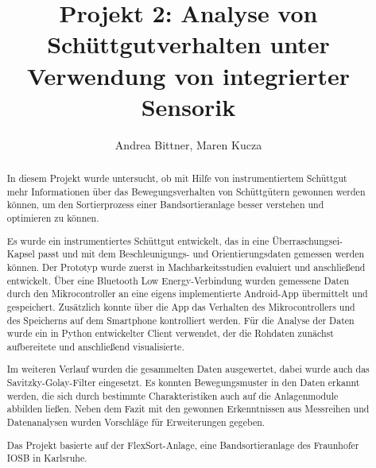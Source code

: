 \documentclass[cover]{isas-seminar}
\title{Projekt 2: Analyse von Schüttgutverhalten unter Verwendung von integrierter Sensorik}
\author{Andrea Bittner, Maren Kucza}
\begin{document}
\maketitle

\begin{abstract}
In diesem Projekt wurde untersucht, ob mit Hilfe von instrumentiertem Schüttgut mehr Informationen über das Bewegungsverhalten von Schüttgütern gewonnen werden können, um den Sortierprozess einer Bandsortieranlage besser verstehen und optimieren zu können. 

Es wurde ein instrumentiertes Schüttgut entwickelt, das in eine Überraschungsei-Kapsel passt und mit dem Beschleunigungs- und Orientierungsdaten gemessen werden können. Der Prototyp wurde zuerst in Machbarkeitsstudien evaluiert und anschließend entwickelt. Über eine Bluetooth Low Energy-Verbindung wurden gemessene Daten durch den Mikrocontroller an eine eigens implementierte Android-App übermittelt und gespeichert. Zusätzlich konnte über die App das Verhalten des Mikrocontrollers und des Speicherns auf dem Smartphone kontrolliert werden. Für die Analyse der Daten wurde ein in Python entwickelter Client verwendet, der die Rohdaten zunächst aufbereitete und anschließend visualisierte. 

Im weiteren Verlauf wurden die gesammelten Daten ausgewertet, dabei wurde auch das Savitzky-Golay-Filter eingesetzt. Es konnten Bewegungsmuster in den Daten erkannt werden, die sich durch bestimmte Charakteristiken auch auf die Anlagenmodule abbilden ließen. Neben dem Fazit mit den gewonnen Erkenntnissen aus Messreihen und Datenanalysen wurden Vorschläge für Erweiterungen gegeben.

Das Projekt basierte auf der FlexSort-Anlage, eine Bandsortieranlage des Fraunhofer IOSB in Karlsruhe.
\end{abstract}

\clearpage
\tableofcontents
\cleardoublepage




\end{document}

